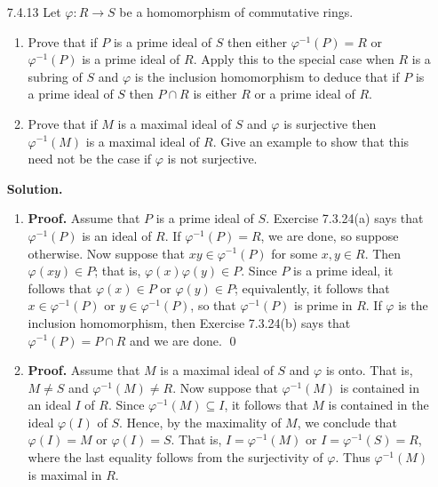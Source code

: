 \begin{enumerate}
   \item[7.4.13]  Let $\varphi : R \rightarrow S$ be a homomorphism of
                  commutative rings.
                  \begin{enumerate}
                     \item Prove that if $P$ is a prime ideal of $S$ then either
                           $\varphi^{-1}(P) = R$ or $\varphi^{-1}(P)$ is a prime
                           ideal of $R$. Apply this to the special case when $R$
                           is a subring of $S$ and $\varphi$ is the inclusion
                           homomorphism to deduce that if $P$ is a prime ideal
                           of $S$ then $P \cap R$ is either $R$ or a prime ideal
                           of $R$.
                     \item Prove that if $M$ is a maximal ideal of $S$ and
                           $\varphi$ is surjective then $\varphi^{-1}(M)$ is a
                           maximal ideal of $R$. Give an example to show that 
                           this need not be the case if $\varphi$ is not
                           surjective.
                  \end{enumerate}
                  
      \textbf{Solution.}
      
      \begin{enumerate}
         \item \textbf{Proof.} Assume that $P$ is a prime ideal of $S$.
               Exercise 7.3.24(a) says that $\varphi^{-1}(P)$ is an ideal of
               $R$. If $\varphi^{-1}(P) = R$, we are done, so suppose otherwise.
               Now suppose that $xy \in \varphi^{-1}(P)$ for some $x, y \in R$.
               Then $\varphi(xy) \in P$;  that is, $\varphi(x)\varphi(y) \in P$.
               Since $P$ is a prime ideal, it follows that $\varphi(x) \in P$ or
               $\varphi(y) \in P$; equivalently, it follows that
               $x \in \varphi^{-1}(P)$ or $y \in \varphi^{-1}(P)$, so that
               $\varphi^{-1}(P)$ is prime in $R$. If $\varphi$ is the inclusion
               homomorphism, then Exercise 7.3.24(b) says that
               $\varphi^{-1}(P) = P \cap R$ and we are done. \qed
         \item \textbf{Proof.} Assume that $M$ is a maximal ideal of $S$ and
               $\varphi$ is onto. That is, $M \neq S$ and
               $\varphi^{-1}(M) \neq R$. Now suppose that $\varphi^{-1}(M)$ is
               contained in an ideal $I$ of $R$. Since
               $\varphi^{-1}(M) \subseteq I$, it follows that $M$ is contained
               in the ideal $\varphi(I)$ of $S$. Hence, by the maximality of
               $M$, we conclude that $\varphi(I) = M$ or $\varphi(I) = S$.
               That is, $I = \varphi^{-1}(M)$ or $I = \varphi^{-1}(S) = R$,
               where the last equality follows from the surjectivity of
               $\varphi$. Thus $\varphi^{-1}(M)$ is maximal in $R$.
               

\end{enumerate}
\end{enumerate}
